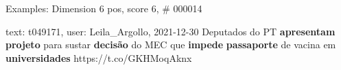 \begin{frame}{Examples: Dimension 6 pos, score 6, \# 000014}
\footnotesize
\begin{exampleblock}{text: t049171, user: Leila\_Argollo, 2021-12-30}
Deputados do PT \textbf{apresentam} \textbf{projeto} para sustar 
\textbf{decisão} do MEC que \textbf{impede} \textbf{passaporte} de vacina em 
\textbf{universidades} https://t.co/GKHMoqAknx 
\end{exampleblock}
\end{frame}
